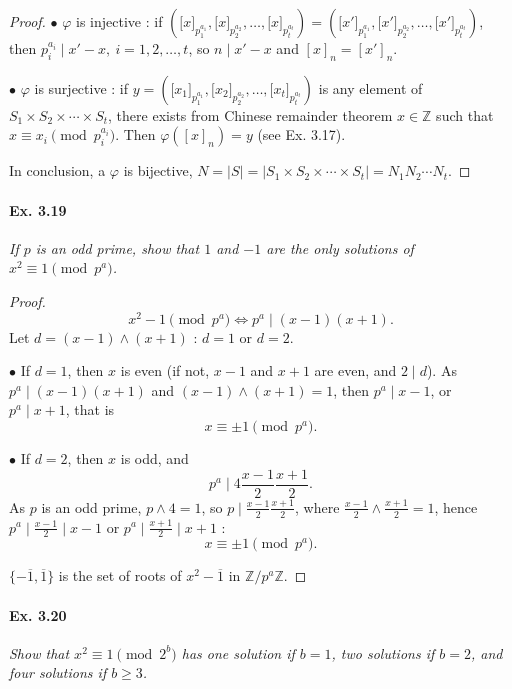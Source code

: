 \documentclass[11pt,a4paper]{article}
\newcommand{\Z}{\mathbb{Z}}
\begin{document}
{\begin{proof}
$\bullet$ $\varphi$ is injective : if $({[}x{]}_{p_1^{a_1}}, {[}x{]}_{p_2^{a_2}},\ldots, {[}x{]}_{p_t^{a_t}}) =({[}x'{]}_{p_1^{a_1}}, {[}x'{]}_{p_2^{a_2}},\ldots, {[}x'{]}_{p_t^{a_t}})$, then $p_i^{a_i} \mid x'-x,\ i=1,2,\ldots,t$, so $n \mid x'-x$ and $[x]_n = [x']_n$.

$\bullet$ $\varphi$ is surjective : if $y=({[}x_1{]}_{p_1^{a_1}}, {[}x_2{]}_{p_2^{a_2}},\ldots, {[}x_t{]}_{p_t^{a_t}})$ is any element of $S_1\times S_2\times \cdots\times S_t$, there exists from Chinese remainder theorem $x \in \Z$ such that $x\equiv x_i \pmod {p_i^{a_i}}$. Then $\varphi([x]_n) = y$ (see Ex. 3.17).

In conclusion, a $\varphi$ is bijective,  $N = \vert S \vert = \vert S_1\times S_2\times \cdots\times S_t \vert= N_1N_2\cdots N_t$.
\end{proof}

\paragraph{Ex. 3.19}

{\it If $p$ is an odd prime, show that $1$ and $-1$ are the only solutions of $x^2 \equiv 1 \pmod {p^a}$.
}

\begin{proof}
$$x^2-1\pmod{p^a} \iff p^a \mid (x-1)(x+1).$$
Let $d = (x-1)\wedge(x+1)$ : $d = 1$ or $d=2$.

$\bullet$ If $d=1$, then $x$ is even (if not, $x-1$ and $x+1$ are even, and $2\mid d$).
As $p^a \mid (x-1)(x+1)$ and $(x-1) \wedge (x+1) = 1$, then $p^a \mid  x-1$, or $p^a \mid x +1$, that is $$x\equiv \pm 1 \pmod {p^a}.$$

$\bullet$ If $d=2$, then $x$ is odd, and
$$p^a \mid 4 \frac{x-1}{2}\frac{x+1}{2}.$$
As $p$ is an odd prime, $p\wedge 4 = 1$, so $p \mid  \frac{x-1}{2}\frac{x+1}{2}$, where  $\frac{x-1}{2}\wedge \frac{x+1}{2} = 1$, hence $p^a \mid  \frac{x-1}{2} \mid x-1$ or $p^a \mid  \frac{x+1}{2} \mid x+1$ : $$x\equiv \pm 1 \pmod {p^a}.$$

$\{-\overline{1},\overline{1}\}$ is the set of roots of $x^2-\overline{1}$ in $\Z/p^a\Z$.
\end{proof}

\paragraph{Ex. 3.20}

{\it Show that $x^2 \equiv 1 \pmod {2^b}$ has one solution if $b = 1$, two solutions if $b = 2$, and four solutions if $b \geq 3$.
}

}
\end{document}
